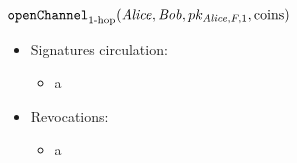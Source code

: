 \begin{figure}[H]
\begin{protocolbox}{$\mathtt{openChannel}_{\text{1-hop}}(\mathit{Alice}, \mathit{Bob},
  pk_{\mathit{Alice}, F, 1}, \mathrm{coins})$}
\begin{algorithmic}[1]
\begin{itemize}
\begin{itemize}
\begin{itemize}
          \item Send our public keys to \charlie in (\textsc{openVirtChan},
          \texttt{counterparty}, \bob) message
        \end{itemize}
        \item \charlie:
        \begin{itemize}
          \item Receive \TODO{} keys from \alice
          \item Send \TODO{} public keys to \alice
        \end{itemize}
      \end{itemize}
      \item Signatures circulation:
      \begin{itemize}
        \item a
      \end{itemize}
      \item Revocations:
      \begin{itemize}
        \item a
      \end{itemize}
    \end{itemize}
    \end{algorithmic}
  \end{protocolbox}
  \caption{}
  \label{alg:protocol:overtwochan}
\end{figure}
